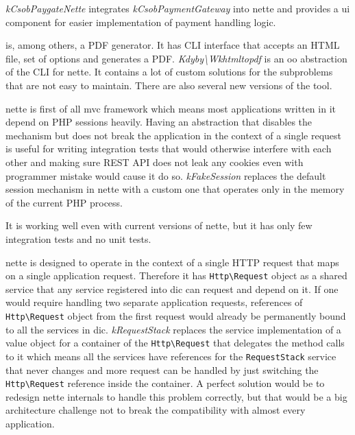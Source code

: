  \label{sec:state:csob-paygate-nette}

\textit{\gls{kCsobPaygateNette}} integrates \textit{\gls{kCsobPaymentGateway}} into \gls{nette} and provides a \gls{ui} component for easier implementation of payment handling logic.

 \label{sec:state:wkhtmltopdf}

 is, among others, a PDF generator. It has CLI interface that accepts an HTML file, set of options and generates a PDF. \textit{Kdyby\textbackslash{}Wkhtmltopdf} is an \gls{oo} abstraction of the CLI for \gls{nette}. It contains a lot of custom solutions for the subproblems that are not easy to maintain. There are also several new versions of the tool.

 \label{sec:state:fake-session}

\gls{nette} is first of all \gls{mvc} framework which means most applications written in it depend on PHP sessions heavily. Having an abstraction that disables the mechanism but does not break the application in the context of a single request is useful for writing integration tests that would otherwise interfere with each other and making sure REST API does not leak any cookies even with programmer mistake would cause it do so. \textit{\gls{kFakeSession}} replaces the default session mechanism in \gls{nette} with a custom one that operates only in the memory of the current PHP process.

It is working well even with current versions of \gls{nette}, but it has only few integration tests and no unit tests.

 \label{sec:state:request-stack}

\gls{nette} is designed to operate in the context of a single HTTP request that maps on a single application request. Therefore it has \lstinline{Http\Request} object as a shared service that any service registered into \gls{dic} can request and depend on it. If one would require handling two separate application requests, references of \lstinline{Http\Request} object from the first request would already be permanently bound to all the services in \gls{dic}. \textit{\gls{kRequestStack}} replaces the service implementation of a value object for a container of the \lstinline{Http\Request} that delegates the method calls to it which means all the services have references for the \lstinline{RequestStack} service that never changes and more request can be handled by just switching the \lstinline{Http\Request} reference inside the container. A perfect solution would be to redesign \gls{nette} internals to handle this problem correctly, but that would be a big architecture challenge not to break the compatibility with almost every application.

